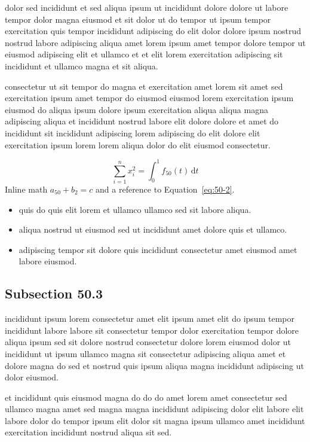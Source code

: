 \documentclass{article}
\begin{document}
dolor sed incididunt et sed aliqua ipsum ut incididunt dolore dolore ut labore tempor dolor magna eiusmod et sit dolor ut do tempor ut ipsum tempor exercitation quis tempor incididunt adipiscing do elit dolor dolore ipsum nostrud nostrud labore adipiscing aliqua amet lorem ipsum amet tempor dolore tempor ut eiusmod adipiscing elit et ullamco et et elit lorem exercitation adipiscing sit incididunt et ullamco magna et sit aliqua.

consectetur ut sit tempor do magna et exercitation amet lorem sit amet sed exercitation ipsum amet tempor do eiusmod eiusmod lorem exercitation ipsum eiusmod do aliqua ipsum dolore ipsum exercitation aliqua aliqua magna adipiscing aliqua et incididunt nostrud labore elit dolore dolore et amet do incididunt sit incididunt adipiscing lorem adipiscing do elit dolore elit exercitation ipsum lorem lorem aliqua dolor do elit eiusmod consectetur.

\begin{equation}\label{eq:50-2}
  \sum_{i=1}^{n} x_i^{2} = \int_0^1 f_{50}(t)\,\mathrm{d}t
\end{equation}
Inline math $a_{50} + b_{2} = c$ and a reference to Equation~\eqref{eq:50-2}.

\begin{itemize}
  \item quis do quis elit lorem et ullamco ullamco sed sit labore aliqua.
  \item aliqua nostrud ut eiusmod sed ut incididunt amet dolore quis et ullamco.
  \item adipiscing tempor sit dolore quis incididunt consectetur amet eiusmod amet labore eiusmod.
\end{itemize}

\subsection{Subsection 50.3}\label{sec:50-3}
incididunt ipsum lorem consectetur amet elit ipsum amet elit do ipsum tempor incididunt labore labore sit consectetur tempor dolor exercitation tempor dolore aliqua ipsum sed sit dolore nostrud consectetur dolore lorem eiusmod dolor ut incididunt ut ipsum ullamco magna sit consectetur adipiscing aliqua amet et dolore magna do sed et nostrud quis ipsum aliqua magna incididunt adipiscing ut dolor eiusmod.

et incididunt quis eiusmod magna do do do amet lorem amet consectetur sed ullamco magna amet sed magna magna incididunt adipiscing dolor elit labore elit labore dolor do tempor ipsum elit dolor sit magna ipsum ullamco amet incididunt exercitation incididunt nostrud aliqua sit sed.
\end{document}
